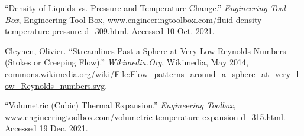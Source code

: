 
\begin{thebibliography}{12}


“Density of Liquids vs. Pressure and Temperature Change.” \emph{Engineering Tool Box}, Engineering Tool Box, \url{www.engineeringtoolbox.com/fluid-density-temperature-pressure-d_309.html}. Accessed 10 Oct. 2021.


Cleynen, Olivier. “Streamlines Past a Sphere at Very Low Reynolds Numbers (Stokes or Creeping Flow).” \emph{Wikimedia.Org}, Wikimedia, May 2014, \url{commons.wikimedia.org/wiki/File:Flow_patterns_around_a_sphere_at_very_low_Reynolds_numbers.svg}.


“Volumetric (Cubic) Thermal Expansion.” \emph{Engineering Toolbox}, \url{www.engineeringtoolbox.com/volumetric-temperature-expansion-d_315.html}. Accessed 19 Dec. 2021.

\end{thebibliography}


